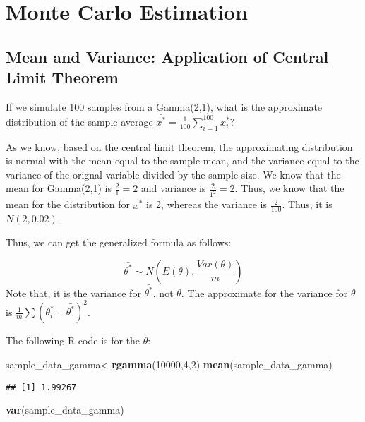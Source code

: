 \documentclass[]{book}
\newenvironment{Shaded}{\begin{snugshade}}{\end{snugshade}}
\newcommand{\DecValTok}[1]{\textcolor[rgb]{0.00,0.00,0.81}{#1}}
\newcommand{\KeywordTok}[1]{\textcolor[rgb]{0.13,0.29,0.53}{\textbf{#1}}}
\newcommand{\NormalTok}[1]{#1}
\begin{document}
\hypertarget{monte-carlo-estimation}{%
\section{Monte Carlo Estimation}\label{monte-carlo-estimation}}

\hypertarget{mean-and-variance-application-of-central-limit-theorem}{%
\subsection{Mean and Variance: Application of Central Limit Theorem}\label{mean-and-variance-application-of-central-limit-theorem}}

If we simulate 100 samples from a Gamma(2,1), what is the approximate distribution of the sample average \(\bar{x^*}=\frac{1}{100} \sum_{i=1}^{100} x_i^*\)?

As we know, based on the central limit theorem, the approximating distribution is normal with the mean equal to the sample mean, and the variance equal to the variance of the orignal variable divided by the sample size. We know that the mean for Gamma(2,1) is \(\frac{2}{1}=2\) and variance is \(\frac{2}{1^2}=2\). Thus, we know that the mean for the distribution for \(\bar{x^*}\) is 2, whereas the variance is \(\frac{2}{100}\). Thus, it is \(N(2,0.02)\).

Thus, we can get the generalized formula as follows:

\[\bar{\theta^*} \sim N(E(\theta), \frac{Var(\theta)}{m})\]
Note that, it is the variance for \(\bar{\theta^*}\), not \(\theta\). The approximate for the variance for \(\theta\) is \(\frac{1}{m}\sum(\theta_i^*-\bar{\theta^*})^2\).

The following R code is for the \(\theta\):

\begin{Shaded}
\begin{Highlighting}[]
\NormalTok{sample_data_gamma<-}\KeywordTok{rgamma}\NormalTok{(}\DecValTok{10000}\NormalTok{,}\DecValTok{4}\NormalTok{,}\DecValTok{2}\NormalTok{)}
\KeywordTok{mean}\NormalTok{(sample_data_gamma)}
\end{Highlighting}
\end{Shaded}

\begin{verbatim}
## [1] 1.99267
\end{verbatim}

\begin{Shaded}
\begin{Highlighting}[]
\KeywordTok{var}\NormalTok{(sample_data_gamma)}
\end{Highlighting}
\end{Shaded}
\end{document}
